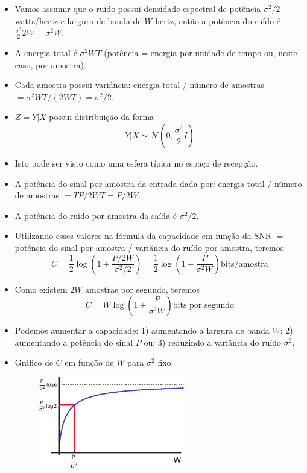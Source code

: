 \begin{frame}[allowframebreaks]
\begin{itemize}
\begin{figure}[h!]
        \label{fig:channeladdnoisemodel2}
        \end{figure}
  \item Vamos assumir que o ruído possui densidade espectral de potência $\sigma^2/2$ watts/hertz e
	largura de banda de $W$ hertz, então a potência do ruído é $\frac{\sigma^2}{2} 2W = \sigma^2 W$.
  \item A energia total é $\sigma^2 WT$ (potência = energia por unidade de tempo ou, neste caso, por amostra).
  \item Cada amostra possui variância:
	 energia total / número de amostras $= \sigma^2 WT/(2WT) = \sigma^2/2$.
  \item $Z = Y|X$ possui distribuição da forma
	\begin{equation}
	Y|X \sim \mathcal{N} \left( 0, \frac{\sigma^2}{2} I \right)
	\end{equation}
  \item Isto pode ser visto como uma esfera típica no espaço de recepção.
  \item A potência do sinal por amostra da entrada dada por: energia total / número de amostras $= TP/2WT = P/2W$.
  \item A potência do ruído por amostra da saída é $\sigma^2/2$.
  \item Utilizando esses valores na fórmula da capacidade em função da SNR $=$ potência
	do sinal por amostra / variância do ruído por amostra, teremos
	\begin{equation}
	C = \frac{1}{2} \log \left( 1 + \frac{P/2W}{\sigma^2/2} \right) = \frac{1}{2} \log \left( 1 + \frac{P}{\sigma^2W} \right) 
	\text{bits/amostra}
	\end{equation}
  \item Como existem $2W$ amostras por segundo, teremos
	\begin{equation}
	C = W \log \left( 1 + \frac{P}{\sigma^2W} \right) \text{bits por segundo}
        \end{equation}
  \item Podemos aumentar a capacidade: 1) aumentando a largura de banda $W$; 2) aumentando a potência do sinal $P$ ou;
	3) reduzindo a variância do ruído $\sigma^2$.
  \end{itemize}
  \framebreak
  \begin{itemize}
  \item Gráfico de $C$ em função de $W$ para $\sigma^2$ fixo.
        \begin{figure}[h!]
        \centering
        \includegraphics[width=0.6\textwidth]{images/capchannelband.pdf}
        \label{fig:capchannelband}
        \end{figure}


\end{itemize}
\end{frame}
